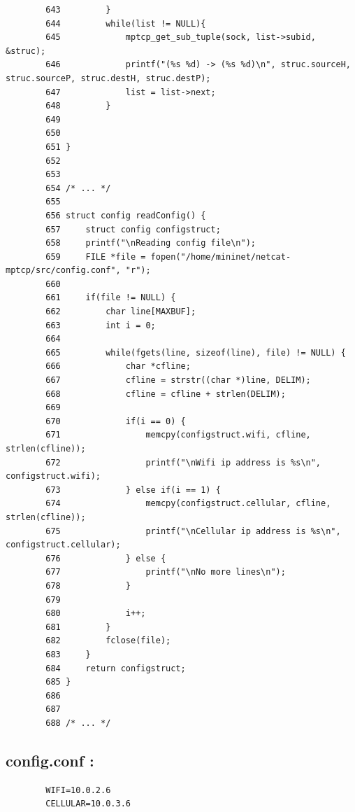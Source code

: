 \documentclass[a4paper,11pt]{article}
\begin{document}
\begin{lstlisting}
		643	        }
		644	        while(list != NULL){
		645	            mptcp_get_sub_tuple(sock, list->subid, &struc);
		646	            printf("(%s %d) -> (%s %d)\n", struc.sourceH, struc.sourceP, struc.destH, struc.destP);
		647	            list = list->next;
		648	        }
		649		
		650
		651	}
		652
		653
		654	/* ... */
		655
		656	struct config readConfig() {
		657		struct config configstruct;
		658		printf("\nReading config file\n");
		659		FILE *file = fopen("/home/mininet/netcat-mptcp/src/config.conf", "r");
		660
		661		if(file != NULL) {
		662			char line[MAXBUF];
		663			int i = 0;
		664
		665			while(fgets(line, sizeof(line), file) != NULL) {
		666				char *cfline;
		667				cfline = strstr((char *)line, DELIM);
		668				cfline = cfline + strlen(DELIM);
		669
		670				if(i == 0) {
		671					memcpy(configstruct.wifi, cfline, strlen(cfline));
		672					printf("\nWifi ip address is %s\n", configstruct.wifi);
		673				} else if(i == 1) {
		674					memcpy(configstruct.cellular, cfline, strlen(cfline));
		675					printf("\nCellular ip address is %s\n", configstruct.cellular);
		676				} else {
		677					printf("\nNo more lines\n");
		678				}
		679
		680				i++;
		681			}
		682			fclose(file);
		683		}
		684		return configstruct;
		685	}
		686
		687
		688	/* ... */
		\end{lstlisting}

		\subsection{config.conf :}
	 	\label{subsec:config.conf}
	 	\begin{lstlisting}
	 	WIFI=10.0.2.6
	 	CELLULAR=10.0.3.6
	 	\end{lstlisting}
				
				
				
\end{document}
